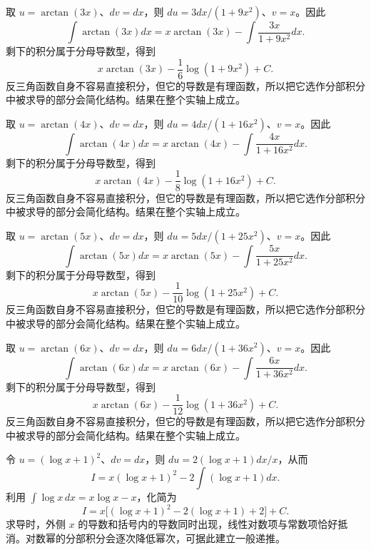 \documentclass[UTF8,12pt,a4paper,fontset=fandol]{ctexart}
\begin{document}
\begin{solve}\label{ans:c15q9}
取 $u=\arctan(3x)$、$dv=dx$，则 $du=3dx/(1+9x^2)$、$v=x$。因此
\[
\int\arctan(3x)dx=x\arctan(3x)-\int\frac{3x}{1+9x^2}dx.
\]
剩下的积分属于分母导数型，得到
\[
x\arctan(3x)-\frac{1}{6}\log(1+9x^2)+C.
\]
反三角函数自身不容易直接积分，但它的导数是有理函数，所以把它选作分部积分中被求导的部分会简化结构。结果在整个实轴上成立。
\end{solve}

\begin{solve}\label{ans:c15q10}
取 $u=\arctan(4x)$、$dv=dx$，则 $du=4dx/(1+16x^2)$、$v=x$。因此
\[
\int\arctan(4x)dx=x\arctan(4x)-\int\frac{4x}{1+16x^2}dx.
\]
剩下的积分属于分母导数型，得到
\[
x\arctan(4x)-\frac{1}{8}\log(1+16x^2)+C.
\]
反三角函数自身不容易直接积分，但它的导数是有理函数，所以把它选作分部积分中被求导的部分会简化结构。结果在整个实轴上成立。
\end{solve}

\begin{solve}\label{ans:c15q11}
取 $u=\arctan(5x)$、$dv=dx$，则 $du=5dx/(1+25x^2)$、$v=x$。因此
\[
\int\arctan(5x)dx=x\arctan(5x)-\int\frac{5x}{1+25x^2}dx.
\]
剩下的积分属于分母导数型，得到
\[
x\arctan(5x)-\frac{1}{10}\log(1+25x^2)+C.
\]
反三角函数自身不容易直接积分，但它的导数是有理函数，所以把它选作分部积分中被求导的部分会简化结构。结果在整个实轴上成立。
\end{solve}

\begin{solve}\label{ans:c15q12}
取 $u=\arctan(6x)$、$dv=dx$，则 $du=6dx/(1+36x^2)$、$v=x$。因此
\[
\int\arctan(6x)dx=x\arctan(6x)-\int\frac{6x}{1+36x^2}dx.
\]
剩下的积分属于分母导数型，得到
\[
x\arctan(6x)-\frac{1}{12}\log(1+36x^2)+C.
\]
反三角函数自身不容易直接积分，但它的导数是有理函数，所以把它选作分部积分中被求导的部分会简化结构。结果在整个实轴上成立。
\end{solve}

\begin{solve}\label{ans:c15q13}
令 $u=(\log x+1)^2$、$dv=dx$，则 $du=2(\log x+1)dx/x$，从而
\[
I=x(\log x+1)^2-2\int(\log x+1)dx.
\]
利用 $\int\log x\,dx=x\log x-x$，化简为
\[
I=x\bigl[(\log x+1)^2-2(\log x+1)+2\bigr]+C.
\]
求导时，外侧 $x$ 的导数和括号内的导数同时出现，线性对数项与常数项恰好抵消。对数幂的分部积分会逐次降低幂次，可据此建立一般递推。
\end{solve}
\end{document}
